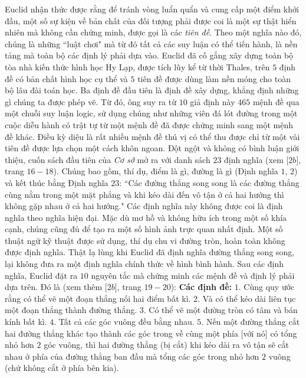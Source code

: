 \begin{multicols}{2}
	\vskip 0.1cm 
	Euclid nhận thức được rằng để tránh vòng luẩn quẩn và cung cấp một điểm khởi đầu, một số sự kiện về bản chất của đối tượng phải được coi là một sự thật hiển nhiên mà không cần chứng minh, được gọi là các \textit{tiên đề}. Theo một nghĩa nào đó, chúng là những ``luật chơi" mà từ đó tất cả các suy luận có thể tiến hành, là nền tảng mà toàn bộ các định lý phải dựa vào.
	\vskip 0.1cm
	Euclid đã cố gắng xây dựng toàn bộ tòa nhà kiến thức hình học Hy Lạp, được tích lũy kể từ thời Thales, trên $5$ định đề có bản chất hình học cụ thể và $5$ tiên đề được dùng làm nền móng cho toàn bộ lâu đài toán học. Ba định đề đầu tiên là định đề xây dựng, khẳng định những gì chúng ta được phép vẽ. Từ đó, ông suy ra từ $10$ giả định này $465$ mệnh đề qua một chuỗi suy luận logic, sử dụng chúng như những viên đá lót đường trong một cuộc diễu hành có trật tự từ một mệnh đề đã được chứng minh sang một mệnh đề khác. Điều kỳ diệu là rất nhiều mệnh đề thú vị có thể thu được chỉ từ một vài tiên đề được lựa chọn một cách  khôn ngoan. 
	\vskip 0.1cm
	Đột ngột và không có bình luận giới thiệu, cuốn sách đầu tiên của \textit{Cơ sở} mở ra với danh sách $23$ định nghĩa (xem [$2b$], trang $16-18$). Chúng bao gồm, thí dụ, điểm là gì, đường là gì (Định nghĩa $1$, $2$) và kết thúc bằng Định nghĩa $23$: ``Các đường thẳng song song là các đường thẳng cùng nằm trong một mặt phẳng và khi kéo dài đến vô tận ở cả hai hướng thì không gặp nhau ở cả hai hướng." Các định nghĩa này không được coi là định nghĩa theo nghĩa hiện đại. Mặc dù mơ hồ và không hữu ích trong một số khía cạnh, chúng cũng đủ để tạo ra một số hình ảnh trực quan nhất định. Một số thuật ngữ kỹ thuật được sử dụng, thí dụ chu vi đường tròn, hoàn toàn không được định nghĩa. Thật lạ lùng khi Euclid đã định nghĩa đường thẳng song song, lại không đưa ra một định nghĩa chính thức về hình bình hành.
	\vskip 0.1cm
	Sau các định nghĩa, Euclid đặt ra $10$ nguyên tắc mà chứng minh các mệnh đề và định lý phải dựa trên. Đó là (xem thêm [$2b$], trang $19-20$):
	\vskip 0.1cm
	\textbf{\color{lichsutoanhoc}Các định đề:}
	\vskip 0.1cm
	$1.$ Cùng quy ước rằng có thể vẽ một đoạn thẳng nối hai điểm bất kì.
	\vskip 0.1cm
	$2.$ Và có thể kéo dài liên tục một đoạn thẳng thành đường thẳng.
	\vskip 0.1cm
	$3.$ Có thể vẽ một đường tròn có tâm và bán kính bất kì.
	\vskip 0.1cm
	$4.$ Tất cả các góc vuông đều bằng nhau.
	\vskip 0.1cm
	$5.$ Nếu một đường thẳng cắt hai đường thẳng khác tạo thành các góc trong về cùng một phía [với nó] có tổng nhỏ hơn $2$ góc vuông, thì hai đường thẳng (bị cắt) khi kéo dài ra vô tận sẽ cắt nhau ở phía của đường thẳng ban đầu mà tổng các góc trong nhỏ hơn $2$ vuông (chứ không cắt ở phía bên kia). 

\end{multicols}
